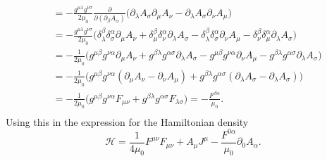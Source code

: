 \begin{example}
\begin{equation}
\begin{split}
			&=-\frac{g^{\mu\lambda}g^{\nu\sigma}}{2\mu_0}\frac{\partial}{\partial(\partial_\beta A_\alpha)}\bigg(\partial_\lambda A_\sigma\partial_\mu A_\nu-\partial_\lambda A_\sigma\partial_\nu A_\mu\bigg)\\
			&=-\frac{g^{\mu\lambda}g^{\nu\sigma}}{2\mu_0}\bigg(\delta_\lambda^\beta\delta_\sigma^\alpha \partial_\mu A_\nu+\delta_\mu^\beta\delta_\nu^\alpha\partial_\lambda A_\sigma-\delta_\lambda^\beta\delta_\sigma^\alpha\partial_\nu A_\mu-\delta_\nu^\beta\delta_\mu^\alpha\partial_\lambda A_\sigma\bigg)\\
			&=-\frac{1}{2\mu_0}\bigg(g^{\mu\beta}g^{\nu\alpha}\partial_\mu A_\nu+g^{\beta\lambda}g^{\alpha\sigma}\partial_\lambda A_\sigma-g^{\mu\beta}g^{\nu\alpha}\partial_\nu A_\mu-g^{\beta\lambda}g^{\alpha\sigma}\partial_\lambda A_\sigma\bigg)\\
			&=-\frac{1}{2\mu_0}\bigg(g^{\mu\beta}g^{\nu\alpha}(\partial_\mu A_\nu-\partial_\nu A_\mu)+g^{\beta\lambda}g^{\alpha\sigma}(\partial_\lambda A_\sigma-\partial_\lambda A_\sigma)\bigg)\\
			&=-\frac{1}{2\mu_0}\bigg(g^{\mu\beta}g^{\nu\alpha}F_{\mu\nu}+g^{\beta\lambda}g^{\alpha\sigma}F_{\lambda\sigma}\bigg)=-\frac{F^{\beta\alpha}}{\mu_0}.\\
		\end{split}
	\end{equation} 
	Using this in the expression for the Hamiltonian density
	\begin{equation}
		\mathcal{H}=\frac{1}{4\mu_0}F^{\mu\nu}F_{\mu\nu}+A_{\mu}J^{\mu}-\frac{F^{0\alpha}}{\mu_0}\partial_{0}A_\alpha.
	\end{equation} 
\end{example}

